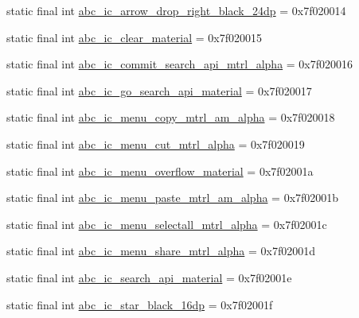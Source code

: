 \begin{CompactItemize}
\item 
static final int \hyperlink{classandroid_1_1support_1_1v7_1_1mediarouter_1_1_r_1_1drawable_b1b1a385b5ca88c4f72c1723498c91b0}{abc\_\-ic\_\-arrow\_\-drop\_\-right\_\-black\_\-24dp} = 0x7f020014
\item 
static final int \hyperlink{classandroid_1_1support_1_1v7_1_1mediarouter_1_1_r_1_1drawable_579e94604dcc3002df8c2a12456841cc}{abc\_\-ic\_\-clear\_\-material} = 0x7f020015
\item 
static final int \hyperlink{classandroid_1_1support_1_1v7_1_1mediarouter_1_1_r_1_1drawable_ef350f03c688da139203dd450a0bbec7}{abc\_\-ic\_\-commit\_\-search\_\-api\_\-mtrl\_\-alpha} = 0x7f020016
\item 
static final int \hyperlink{classandroid_1_1support_1_1v7_1_1mediarouter_1_1_r_1_1drawable_22fe6dbebbf257ca2a64f29104c4260c}{abc\_\-ic\_\-go\_\-search\_\-api\_\-material} = 0x7f020017
\item 
static final int \hyperlink{classandroid_1_1support_1_1v7_1_1mediarouter_1_1_r_1_1drawable_f5676f93d31a07333dac78c397b84c1c}{abc\_\-ic\_\-menu\_\-copy\_\-mtrl\_\-am\_\-alpha} = 0x7f020018
\item 
static final int \hyperlink{classandroid_1_1support_1_1v7_1_1mediarouter_1_1_r_1_1drawable_3d2590abd150dcb68d689668e899c414}{abc\_\-ic\_\-menu\_\-cut\_\-mtrl\_\-alpha} = 0x7f020019
\item 
static final int \hyperlink{classandroid_1_1support_1_1v7_1_1mediarouter_1_1_r_1_1drawable_a4e29bf9c4b144192cbb0720c06782aa}{abc\_\-ic\_\-menu\_\-overflow\_\-material} = 0x7f02001a
\item 
static final int \hyperlink{classandroid_1_1support_1_1v7_1_1mediarouter_1_1_r_1_1drawable_4d9cefe09c34d6545bfdaf3dc2a7d354}{abc\_\-ic\_\-menu\_\-paste\_\-mtrl\_\-am\_\-alpha} = 0x7f02001b
\item 
static final int \hyperlink{classandroid_1_1support_1_1v7_1_1mediarouter_1_1_r_1_1drawable_5c20dff21af72d67a20edf617a22edba}{abc\_\-ic\_\-menu\_\-selectall\_\-mtrl\_\-alpha} = 0x7f02001c
\item 
static final int \hyperlink{classandroid_1_1support_1_1v7_1_1mediarouter_1_1_r_1_1drawable_1401cbd601dbe4d6877d6aba87b0ae8b}{abc\_\-ic\_\-menu\_\-share\_\-mtrl\_\-alpha} = 0x7f02001d
\item 
static final int \hyperlink{classandroid_1_1support_1_1v7_1_1mediarouter_1_1_r_1_1drawable_97372cbbf9418d81e5e8bb79dc696bce}{abc\_\-ic\_\-search\_\-api\_\-material} = 0x7f02001e
\item 
static final int \hyperlink{classandroid_1_1support_1_1v7_1_1mediarouter_1_1_r_1_1drawable_9c9e9db439093f6084bff83c32cf05e5}{abc\_\-ic\_\-star\_\-black\_\-16dp} = 0x7f02001f

\end{CompactItemize}
